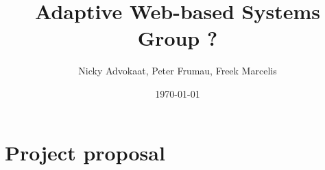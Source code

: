 \documentclass[a4paper]{article}
\title{Adaptive Web-based Systems \\ Group ?}
\author{Nicky Advokaat, Peter Frumau, Freek Marcelis}
\date{\today}
\begin{document}
\maketitle

\section{Project proposal}

\begin{thebibliography}{9}
 
\end{thebibliography}
\end{document}
